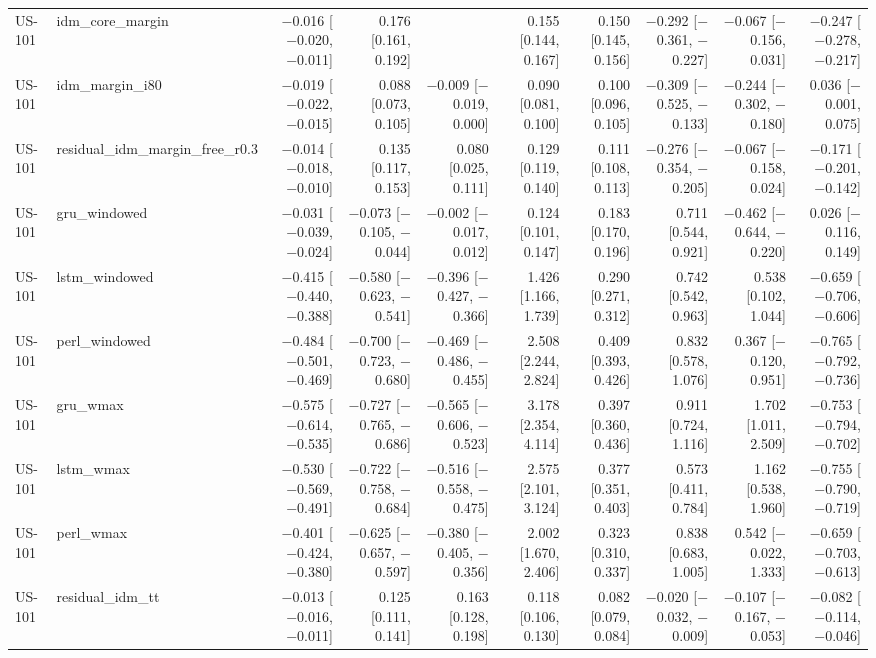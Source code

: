 \begin{table}[htbp]
{\begin{tabular}{llrrrrrrrr}
US-101 & idm\_core\_margin & $-$0.016 [$-$0.020, $-$0.011] & 0.176 [0.161, 0.192] &  & 0.155 [0.144, 0.167] & 0.150 [0.145, 0.156] & $-$0.292 [$-$0.361, $-$0.227] & $-$0.067 [$-$0.156, 0.031] & $-$0.247 [$-$0.278, $-$0.217] \\
US-101 & idm\_margin\_i80 & $-$0.019 [$-$0.022, $-$0.015] & 0.088 [0.073, 0.105] & $-$0.009 [$-$0.019, 0.000] & 0.090 [0.081, 0.100] & 0.100 [0.096, 0.105] & $-$0.309 [$-$0.525, $-$0.133] & $-$0.244 [$-$0.302, $-$0.180] & 0.036 [$-$0.001, 0.075] \\
US-101 & residual\_idm\_margin\_free\_r0.3 & $-$0.014 [$-$0.018, $-$0.010] & 0.135 [0.117, 0.153] & 0.080 [0.025, 0.111] & 0.129 [0.119, 0.140] & 0.111 [0.108, 0.113] & $-$0.276 [$-$0.354, $-$0.205] & $-$0.067 [$-$0.158, 0.024] & $-$0.171 [$-$0.201, $-$0.142] \\
US-101 & gru\_windowed & $-$0.031 [$-$0.039, $-$0.024] & $-$0.073 [$-$0.105, $-$0.044] & $-$0.002 [$-$0.017, 0.012] & 0.124 [0.101, 0.147] & 0.183 [0.170, 0.196] & 0.711 [0.544, 0.921] & $-$0.462 [$-$0.644, $-$0.220] & 0.026 [$-$0.116, 0.149] \\
US-101 & lstm\_windowed & $-$0.415 [$-$0.440, $-$0.388] & $-$0.580 [$-$0.623, $-$0.541] & $-$0.396 [$-$0.427, $-$0.366] & 1.426 [1.166, 1.739] & 0.290 [0.271, 0.312] & 0.742 [0.542, 0.963] & 0.538 [0.102, 1.044] & $-$0.659 [$-$0.706, $-$0.606] \\
US-101 & perl\_windowed & $-$0.484 [$-$0.501, $-$0.469] & $-$0.700 [$-$0.723, $-$0.680] & $-$0.469 [$-$0.486, $-$0.455] & 2.508 [2.244, 2.824] & 0.409 [0.393, 0.426] & 0.832 [0.578, 1.076] & 0.367 [$-$0.120, 0.951] & $-$0.765 [$-$0.792, $-$0.736] \\
US-101 & gru\_wmax & $-$0.575 [$-$0.614, $-$0.535] & $-$0.727 [$-$0.765, $-$0.686] & $-$0.565 [$-$0.606, $-$0.523] & 3.178 [2.354, 4.114] & 0.397 [0.360, 0.436] & 0.911 [0.724, 1.116] & 1.702 [1.011, 2.509] & $-$0.753 [$-$0.794, $-$0.702] \\
US-101 & lstm\_wmax & $-$0.530 [$-$0.569, $-$0.491] & $-$0.722 [$-$0.758, $-$0.684] & $-$0.516 [$-$0.558, $-$0.475] & 2.575 [2.101, 3.124] & 0.377 [0.351, 0.403] & 0.573 [0.411, 0.784] & 1.162 [0.538, 1.960] & $-$0.755 [$-$0.790, $-$0.719] \\
US-101 & perl\_wmax & $-$0.401 [$-$0.424, $-$0.380] & $-$0.625 [$-$0.657, $-$0.597] & $-$0.380 [$-$0.405, $-$0.356] & 2.002 [1.670, 2.406] & 0.323 [0.310, 0.337] & 0.838 [0.683, 1.005] & 0.542 [$-$0.022, 1.333] & $-$0.659 [$-$0.703, $-$0.613] \\
US-101 & residual\_idm\_tt & $-$0.013 [$-$0.016, $-$0.011] & 0.125 [0.111, 0.141] & 0.163 [0.128, 0.198] & 0.118 [0.106, 0.130] & 0.082 [0.079, 0.084] & $-$0.020 [$-$0.032, $-$0.009] & $-$0.107 [$-$0.167, $-$0.053] & $-$0.082 [$-$0.114, $-$0.046] \\

\end{tabular}}
\end{table}
